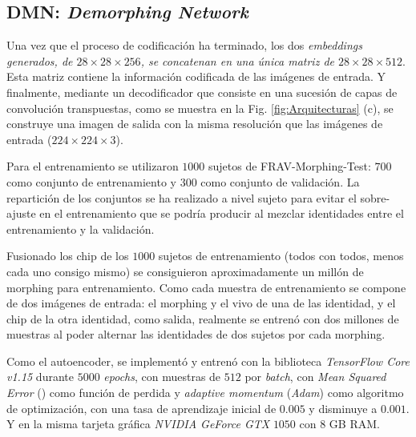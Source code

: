 
\subsection{DMN: \textit{Demorphing Network}} \label{ref:Decoderfaces}

Una vez que el proceso de codificación ha terminado, los dos \textit{\glspl{embedding} generados, de $28\times28\times256$, se concatenan en una única matriz de $28\times28\times512$}. Esta matriz contiene la información codificada de las imágenes de entrada. Y finalmente, mediante un decodificador que consiste en una sucesión de capas de convolución transpuestas, como se muestra en la Fig. \ref{fig:Arquitecturas} (c), se construye una imagen de salida con la misma resolución que las imágenes de entrada ($224\times224\times3$).

Para el entrenamiento se utilizaron $1000$ sujetos de \Gls{FRAV-Morphing-Test}: $700$ como conjunto de entrenamiento y $300$ como conjunto de validación. La repartición de los conjuntos se ha realizado a nivel sujeto para evitar el sobre-ajuste en el entrenamiento que se podría producir al mezclar identidades entre el entrenamiento y la validación.

Fusionado los \gls{chip} de los $1000$ sujetos de entrenamiento (todos con todos, menos cada uno consigo mismo) se consiguieron aproximadamente un millón de \gls{morphing} para entrenamiento. Como cada muestra de entrenamiento se compone de dos imágenes de entrada: el \gls{morphing} y el \gls{vivo} de una de las identidad, y el \gls{chip} de la otra identidad, como salida, realmente se entrenó con dos millones de muestras al poder alternar las identidades de dos sujetos por cada \gls{morphing}. 

Como el \gls{autoencoder},  se implementó y entrenó con la biblioteca \textit{TensorFlow Core v1.15} durante $5000$ \textit{epochs}, con muestras de $512$ por \textit{batch}, con \textit{Mean Squared Error} () como función de perdida y \textit{adaptive momentum} (\textit{Adam}) \cite{kingma2014adam}  como algoritmo de optimización, con una tasa de aprendizaje inicial de $0.005$ y disminuye a $0.001$. Y en la misma tarjeta gráfica \textit{NVIDIA GeForce GTX} $1050$ con $8$ GB RAM. 

